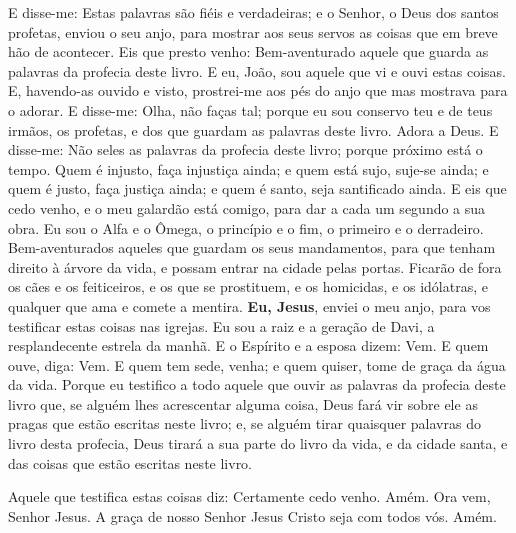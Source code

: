 E disse-me: Estas palavras são fiéis e verdadeiras; e o Senhor, o
Deus dos santos profetas, enviou o seu anjo, para mostrar aos seus
servos as coisas que em breve hão de acontecer. Eis que presto
venho: Bem-aventurado aquele que guarda as palavras da profecia
deste livro. E eu, João, sou aquele que vi e ouvi estas coisas.
E, havendo-as ouvido e visto, prostrei-me aos pés do anjo que mas
mostrava para o adorar. E disse-me: Olha, não faças tal; porque
eu sou conservo teu e de teus irmãos, os profetas, e dos que guardam
as palavras deste livro. Adora a Deus. E disse-me: Não seles
as palavras da profecia deste livro; porque próximo está o tempo.
Quem é injusto, faça injustiça ainda; e quem está sujo,
suje-se ainda; e quem é justo, faça justiça ainda; e quem é santo,
seja santificado ainda. E eis que cedo venho, e o meu
galardão está comigo, para dar a cada um segundo a sua obra.
Eu sou o Alfa e o Ômega, o princípio e o fim, o primeiro e o
derradeiro. Bem-aventurados aqueles que guardam os seus
mandamentos, para que tenham direito à árvore da vida, e possam
entrar na cidade pelas portas. Ficarão de fora os cães e os
feiticeiros, e os que se prostituem, e os homicidas, e os idólatras,
e qualquer que ama e comete a mentira. \textbf{Eu, Jesus},
enviei o meu anjo, para vos testificar estas coisas nas igrejas. Eu
sou a raiz e a geração de Davi, a resplandecente estrela da manhã.
E o Espírito e a esposa dizem: Vem. E quem ouve, diga: Vem. E
quem tem sede, venha; e quem quiser, tome de graça da água da vida.
Porque eu testifico a todo aquele que ouvir as palavras da
profecia deste livro que, se alguém lhes acrescentar alguma coisa,
Deus fará vir sobre ele as pragas que estão escritas neste livro;
 e, se alguém tirar quaisquer palavras do livro desta
profecia, Deus tirará a sua parte do livro da vida, e da cidade
santa, e das coisas que estão escritas neste livro.

Aquele que testifica estas coisas diz: Certamente cedo venho.
Amém. Ora vem, Senhor Jesus. A graça de nosso Senhor Jesus
Cristo seja com todos vós. Amém.

